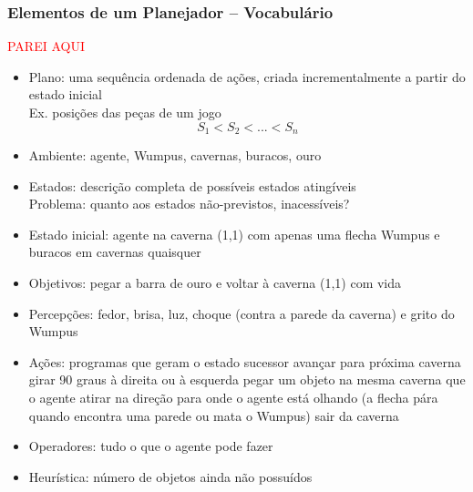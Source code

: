 \begin{frame}[fragile, allowframebreaks=0.9]
\frametitle{Elementos de um  Planejador -- Vocabulário}

\textcolor{red}{PAREI AQUI}

\begin{itemize}
 \item Plano: uma sequência ordenada de ações, 
 criada incrementalmente a partir do estado inicial\\
Ex. posições das peças de um jogo\\
$$S_1 < S_2 < ... < S_n$$
 
  \item Ambiente:
agente, Wumpus, cavernas, buracos, ouro

  \item  Estados:   descrição completa de possíveis estados atingíveis\\
  Problema: quanto aos estados não-previstos, inacessíveis?

  \item  Estado inicial:
agente na caverna (1,1) com apenas uma flecha
 Wumpus e buracos em cavernas quaisquer

  \item Objetivos:
pegar a barra de ouro e voltar à caverna (1,1) com vida

  \item  Percepções: 
fedor, brisa, luz, choque (contra a parede da caverna) e grito do Wumpus

  \item Ações: programas que geram o estado sucessor
avançar para próxima caverna
girar 90 graus à direita ou à esquerda
pegar um objeto na mesma caverna que o agente
atirar na direção para onde o agente está olhando (a flecha pára quando encontra uma parede ou mata o Wumpus)
 sair da caverna
 
 \item Operadores: tudo o que o agente pode fazer
 
 \item Heurística: número de objetos ainda não possuídos
 
\end{itemize}

\end{frame}




